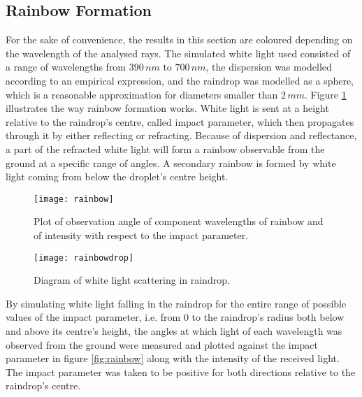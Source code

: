 \documentclass{article}
\begin{document}
\subsection{Rainbow Formation}
For the sake of convenience, the results in this section are coloured depending on the wavelength of the analysed rays. The simulated white light used consisted of a range of wavelengths from $390\,nm$ to $700\,nm$, the dispersion was modelled according to an empirical expression\cite{dispersion}, and the raindrop was modelled as a sphere, which is a reasonable approximation for diameters smaller than $2\,mm$\cite{raindrop}. Figure \ref{fig:raindrop} illustrates the way rainbow formation works. White light is sent at a height relative to the raindrop's centre, called impact parameter, which then propagates through it by either reflecting or refracting. Because of dispersion and reflectance, a part of the refracted white light will form a rainbow observable from the ground at a specific range of angles. A secondary rainbow is formed by white light coming from below the droplet's centre height.

\begin{figure}[h]
  \begin{minipage}[b]{0.55\textwidth}
	\centering
   \texttt{[image: rainbow]}
   \caption{Plot of observation angle of component wavelengths of rainbow and of intensity with respect to the impact parameter.}
	\label{fig:rainbow}
  \end{minipage}
  \begin{minipage}[b]{0.5\textwidth}
	\centering
   \texttt{[image: rainbowdrop]}
   \caption{Diagram of white light scattering in raindrop.}
	\label{fig:raindrop}
  \end{minipage}
\end{figure}

By simulating white light falling in the raindrop for the entire range of possible values of the impact parameter, i.e. from 0 to the raindrop's radius both below and above its centre's height, the angles at which light of each wavelength was observed from the ground were measured and plotted against the impact parameter in figure \ref{fig:rainbow} along with the intensity of the received light. The impact parameter was taken to be positive for both directions relative to the raindrop's centre.
\end{document}
